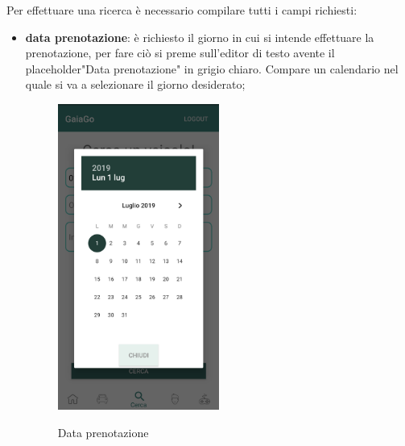 Per effettuare una ricerca è necessario compilare tutti i campi richiesti:
\begin{itemize}
	\item \textbf{data prenotazione}: è richiesto il giorno in cui si intende effettuare la prenotazione, per fare ciò si preme sull'editor di testo avente il placeholder\glosp "Data prenotazione" in grigio chiaro. Compare un calendario nel quale si va a selezionare il giorno desiderato;
	 \begin{figure}[H] 
	 	\centering 
	 	\includegraphics[width=0.5\textwidth]{res/images/data_prenotazione.png}\\
	 	\caption{Data prenotazione}
	 	\label{data}
	 \end{figure}
 \pagebreak
 

\end{itemize}
